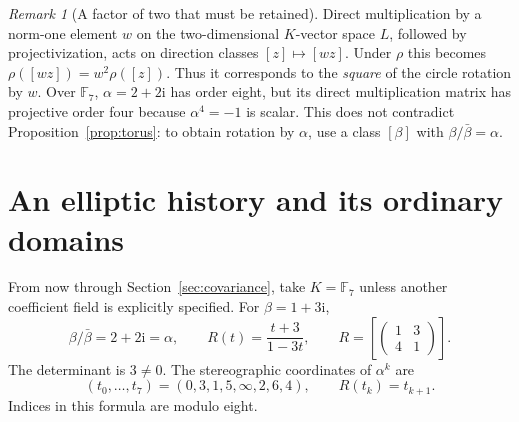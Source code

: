 \documentclass[11pt]{article}
\theoremstyle{definition}
\theoremstyle{remark}
\newtheorem{remark}[theorem]{Remark}
\newcommand{\F}{\mathbb F}
\newcommand{\ii}{\mathrm i}
\begin{document}
\begin{remark}[A factor of two that must be retained]\label{rem:double}
Direct multiplication by a norm-one element $w$ on the two-dimensional
$K$-vector space $L$, followed by projectivization, acts on direction
classes $[z]\mapsto[wz]$. Under $\rho$ this becomes
$\rho([wz])=w^2\rho([z])$.
Thus it corresponds to the \emph{square} of the circle rotation by $w$.
Over $\F_7$, $\alpha=2+2\ii$ has order eight, but its direct multiplication
matrix has projective order four because $\alpha^4=-1$ is scalar.
This does not contradict Proposition~\ref{prop:torus}: to obtain rotation by
$\alpha$, use a class $[\beta]$ with $\beta/\bar\beta=\alpha$.
\end{remark}

\section{An elliptic history and its ordinary domains}
From now through Section~\ref{sec:covariance}, take $K=\F_7$ unless another
coefficient field is explicitly specified. For $\beta=1+3\ii$,
\[
 \beta/\bar\beta=2+2\ii=\alpha,\qquad
 R(t)=\frac{t+3}{1-3t},\qquad
 R=\left[\begin{pmatrix}1&3\\4&1\end{pmatrix}\right].
\]
The determinant is $3\ne0$. The stereographic coordinates of $\alpha^k$ are
\begin{equation}\label{eq:cycle}
 (t_0,\ldots,t_7)=(0,3,1,5,\infty,2,6,4),\qquad R(t_k)=t_{k+1}.
\end{equation}
Indices in this formula are modulo eight.
\end{document}
